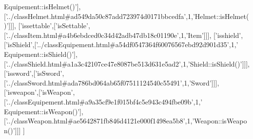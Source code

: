 \begin{DoxyCode}
{      Equipement::isHelmet()'}],[\textcolor{stringliteral}{'../classHelmet.html#ad549da50c87add723974d0171bbcedfa'},1,\textcolor{stringliteral}{'Helmet::isHelmet()'}]]],
  [\textcolor{stringliteral}{'issettable'},[\textcolor{stringliteral}{'isSettable'},[\textcolor{stringliteral}{'../classItem.html#a4b6ebdced0c34d42adb47db18c01190e'},1,\textcolor{stringliteral}{'Item'}]]],
  [\textcolor{stringliteral}{'isshield'},[\textcolor{stringliteral}{'isShield'},[\textcolor{stringliteral}{'../classEquipement.html#a54df0547364f60076567ebd92d901d35'},1,\textcolor{stringliteral}{'
      Equipement::isShield()'}],[\textcolor{stringliteral}{'../classShield.html#a1a3c42107ce47e8087be513d631e5ad2'},1,\textcolor{stringliteral}{'Shield::isShield()'}]]],
  [\textcolor{stringliteral}{'issword'},[\textcolor{stringliteral}{'isSword'},[\textcolor{stringliteral}{'../classSword.html#ada786bd064ab65f07511124540c55491'},1,\textcolor{stringliteral}{'Sword'}]]],
  [\textcolor{stringliteral}{'isweapon'},[\textcolor{stringliteral}{'isWeapon'},[\textcolor{stringliteral}{'../classEquipement.html#a9a35cf9e1f015bf4c5e943c494fbe09b'},1,\textcolor{stringliteral}{'
      Equipement::isWeapon()'}],[\textcolor{stringliteral}{'../classWeapon.html#ae5642871fb846d4121e000f1498ea5b8'},1,\textcolor{stringliteral}{'Weapon::isWeapon()'}]]]
]
\end{DoxyCode}

